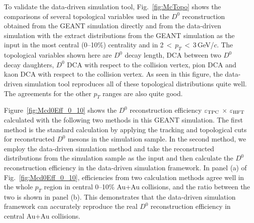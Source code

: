 \documentclass[%
 reprint,	
 amsmath,amssymb,
 aps,
 prc,
]{revtex4-1}
\begin{document}

To validate the data-driven simulation tool, Fig.~\ref{fig:McTopo} shows the comparisons of several topological variables used in the $D^0$ reconstruction obtained from the GEANT simulation directly and from the data-driven simulation with the extract distributions from the GEANT simulation as the input in the most central (0--10\%) centrality and in 2\,$<$\,$p_{T}$\,$<$\,3\,GeV/$c$. The topological variables shown here are $D^0$ decay length, DCA between two $D^0$ decay daughters, $D^0$ DCA with respect to the collision vertex, pion DCA and kaon DCA with respect to the collision vertex. As seen in this figure, the data-driven simulation tool reproduces all of these topological distributions quite well. The agreements for the other $p_{T}$ ranges are also quite good.

Figure~\ref{fig:Mcd0Eff_0_10} shows the $D^0$ reconstruction efficiency $\varepsilon_{\rm TPC}$ $\times$ $\varepsilon_{\rm HFT}$ calculated with the following two methods in this GEANT simulation. The first method is the standard calculation by applying the tracking and topological cuts for reconstructed $D^0$ mesons in the simulation sample. In the second method, we employ the data-driven simulation method and take the reconstructed distributions from the simulation sample as the input and then calculate the $D^0$ reconstruction efficiency in the data-driven simulation framework. In panel (a) of Fig.~\ref{fig:Mcd0Eff_0_10}, efficiencies from two calculation methods agree well in the whole $p_{T}$ region in central 0--10\% Au+Au collisions, and the ratio between the two is shown in panel (b). This demonstrates that the data-driven simulation framework can accurately reproduce the real $D^0$ reconstruction efficiency in central Au+Au collisions.
\end{document}
